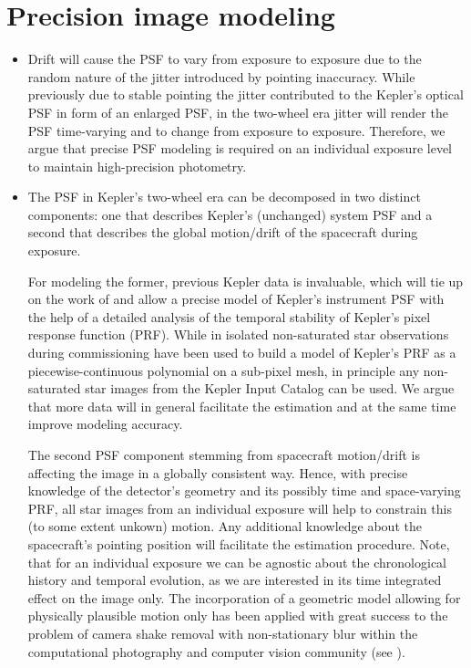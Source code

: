 \documentclass[letterpaper,12pt,preprint]{aastex}
\begin{document}
\section{Precision image modeling}\label{sec:modeling}
\begin{itemize}
\item Drift will cause the PSF to vary from exposure to exposure due
  to the random nature of the jitter introduced by pointing
  inaccuracy. While previously due to stable pointing the jitter
  contributed to the Kepler's optical PSF in form of an enlarged PSF,
  in the two-wheel era jitter will render the PSF time-varying and
  to change from exposure to exposure. Therefore, we argue that
  precise PSF modeling is required on an individual exposure level to
  maintain high-precision photometry.

\item The PSF in Kepler's two-wheel era can be decomposed in two
  distinct components: one that describes Kepler's (unchanged) system
  PSF and a second that describes the global motion/drift of the
  spacecraft during exposure. 

  For modeling the former, previous Kepler data is invaluable, which
  will tie up on the work of \cite{bryson2010} and allow a precise
  model of Kepler's instrument PSF with the help of a detailed
  analysis of the temporal stability of Kepler's pixel response
  function (PRF). While in \cite{bryson} isolated non-saturated star
  observations during commissioning have been used to build a model of
  Kepler's PRF as a piecewise-continuous polynomial on a sub-pixel
  mesh, in principle any non-saturated star images from the Kepler
  Input Catalog can be used. We argue that more data will in general
  facilitate the estimation and at the same time improve modeling
  accuracy. 

  The second PSF component stemming from spacecraft motion/drift is
  affecting the image in a globally consistent way. Hence, with
  precise knowledge of the detector's geometry and its possibly time
  and space-varying PRF, all star images from an individual exposure
  will help to constrain this (to some extent unkown) motion. Any
  additional knowledge about the spacecraft's pointing position will
  facilitate the estimation procedure. Note, that for an individual
  exposure we can be agnostic about the chronological history and
  temporal evolution, as we are interested in its time integrated
  effect on the image only. The incorporation of a geometric model
  allowing for physically plausible motion only has been applied with
  great success to the problem of camera shake removal with
  non-stationary blur within the computational photography and
  computer vision community (see \cite{hirsch2011}).


\end{itemize}
\end{document}
